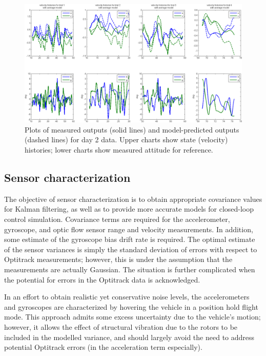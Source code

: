 \documentclass{article}
\begin{document}
\begin{figure}[tb!]
\centering
\includegraphics[width = \textwidth]{../../near system identification/model_day_2.png}
\caption{Plots of measured outputs (solid lines) and model-predicted outputs (dashed lines) for day 2 data. Upper charts show state (velocity) histories; lower charts show measured attitude for reference.}
\label{fig:day2mse}
\end{figure}

\subsection{Sensor characterization}

The objective of sensor characterization is to obtain appropriate covariance values for Kalman filtering, as well as to provide more accurate models for closed-loop control simulation. Covariance terms are required for the accelerometer, gyroscope, and optic flow sensor range and velocity measurements. In addition, some estimate of the gyroscope bias drift rate is required. The optimal estimate of the sensor variances is simply the standard deviation of errors with respect to Optitrack measurements; however, this is under the assumption that the measurements are actually Gaussian. The situation is further complicated when the potential for errors in the Optitrack data is acknowledged.

In an effort to obtain realistic yet conservative noise levels, the accelerometers and gyroscopes are characterized by hovering the vehicle in a position hold flight mode. This approach admits some excess uncertainty due to the vehicle's motion; however, it allows the effect of structural vibration due to the rotors to be included in the modelled variance, and should largely avoid the need to address potential Optitrack errors (in the acceleration term especially). 
\end{document}
